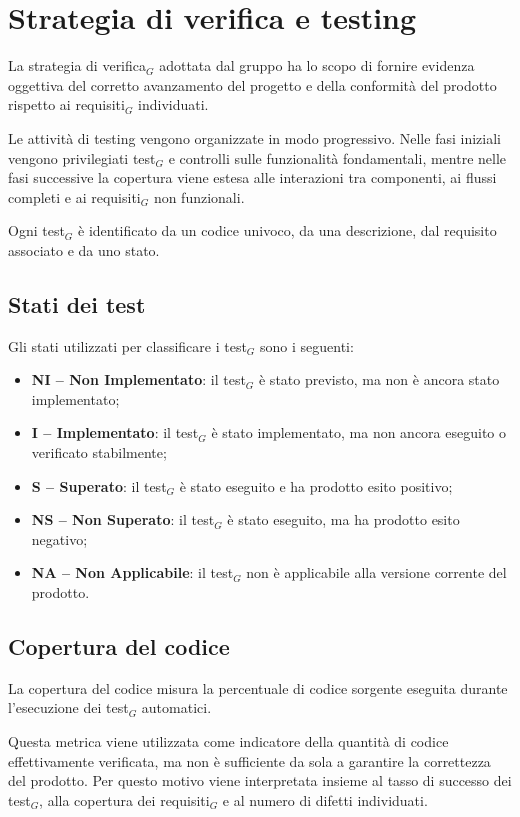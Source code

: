 \documentclass[a4paper, 10pt, colorlinks=true, linkcolor=black, urlcolor=blue, citecolor=blue, hidelinks]{article}
\begin{document}
\section{Strategia di verifica e testing}

La strategia di verifica$_G$ adottata dal gruppo ha lo scopo di fornire evidenza oggettiva del corretto avanzamento del progetto e della conformità del prodotto rispetto ai requisiti$_G$ individuati.

Le attività di testing vengono organizzate in modo progressivo. Nelle fasi iniziali vengono privilegiati test$_G$ e controlli sulle funzionalità fondamentali, mentre nelle fasi successive la copertura viene estesa alle interazioni tra componenti, ai flussi completi e ai requisiti$_G$ non funzionali.

Ogni test$_G$ è identificato da un codice univoco, da una descrizione, dal requisito associato e da uno stato.

\subsection{Stati dei test}

Gli stati utilizzati per classificare i test$_G$ sono i seguenti:

\begin{itemize}
    \item \textbf{NI -- Non Implementato}: il test$_G$ è stato previsto, ma non è ancora stato implementato;
    \item \textbf{I -- Implementato}: il test$_G$ è stato implementato, ma non ancora eseguito o verificato stabilmente;
    \item \textbf{S -- Superato}: il test$_G$ è stato eseguito e ha prodotto esito positivo;
    \item \textbf{NS -- Non Superato}: il test$_G$ è stato eseguito, ma ha prodotto esito negativo;
    \item \textbf{NA -- Non Applicabile}: il test$_G$ non è applicabile alla versione corrente del prodotto.
\end{itemize}

\subsection{Copertura del codice}

La copertura del codice misura la percentuale di codice sorgente eseguita durante l'esecuzione dei test$_G$ automatici.

Questa metrica viene utilizzata come indicatore della quantità di codice effettivamente verificata, ma non è sufficiente da sola a garantire la correttezza del prodotto. Per questo motivo viene interpretata insieme al tasso di successo dei test$_G$, alla copertura dei requisiti$_G$ e al numero di difetti individuati.
\end{document}
